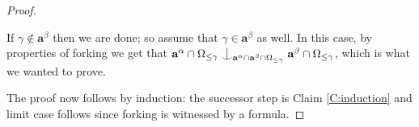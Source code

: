 \documentclass[10pt,a4paper]{amsart}
\DeclareMathOperator{\dcl}{dcl}
\newcommand{\forkindep}[1][]{%
  \mathrel{
    \mathop{
      \vcenter{
        \hbox{\oalign{\noalign{\kern-.3ex}\hfil$\vert$\hfil\cr
              \noalign{\kern-.7ex}
              $\smile$\cr\noalign{\kern-.3ex}}}
      }
    }\displaylimits_{#1}
  }
}
\begin{document}
\begin{proof}
\begin{claimproof}
If $\gamma\notin \mathbf{a}^\beta$ then we are done; so assume that $\gamma\in \mathbf{a}^\beta$ as well. In this case, by properties of forking we get that $\mathbf{a}^\alpha\cap  \Omega_{\leq \gamma}\forkindep[\mathbf{a}^\alpha\cap \mathbf{a}^\beta\cap \Omega_{\leq \gamma}]\mathbf{a}^\beta\cap\Omega_{\leq \gamma}$, which is what we wanted to prove.
\end{claimproof}
The proof now follows by induction: the successor step is Claim \ref{C:induction} and limit case follows since forking is witnessed by a formula.
%
%
%
\end{proof}
\end{document}
